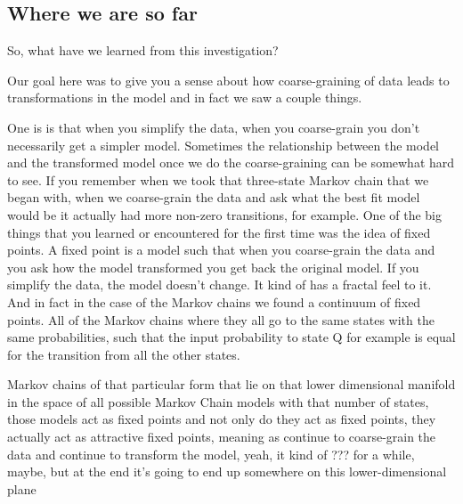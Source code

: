 \documentclass[]{article}
\begin{document}
\subsection{Where we are so far}

So, what have we learned from this investigation?

Our goal here was to give you
a sense about how coarse-graining
of data
leads to transformations
in the model
and in fact
we saw a couple things.

One is is that when you simplify the data,
when you coarse-grain you don't necessarily get a simpler model.
Sometimes the relationship between
the model and the transformed model
once we do the coarse-graining
can be somewhat hard to see.
If you remember when we
took that three-state
Markov chain that we began with,
when we coarse-grain the data and ask
what the best fit model would be
it actually had more
non-zero transitions, for example.
One of the big things that you learned
or encountered for the first time
was the idea of fixed points.
A fixed point is a model such that
when you coarse-grain the data
and you ask how the model transformed
you get back the original model.
If you simplify the data,
the model doesn't change.
It kind of has a fractal feel to it.
And in fact in the case of
the Markov chains we found a
continuum of fixed points.
All of the Markov chains where
they all go to the same states
with the same probabilities,
such that the input probability
to state Q for example
is equal for the transition
from all the other states.

Markov chains of that particular form
that lie on that lower dimensional manifold
in the space of all possible Markov
Chain models with that number of states,
those models act as fixed points
and not only do they act as fixed points,
they actually act as attractive fixed points,
meaning as continue to coarse-grain the data
and continue to transform the model,
yeah, it kind of ??? for a while, maybe,
but at the end it's going to end up
somewhere on this lower-dimensional plane
\end{document}
